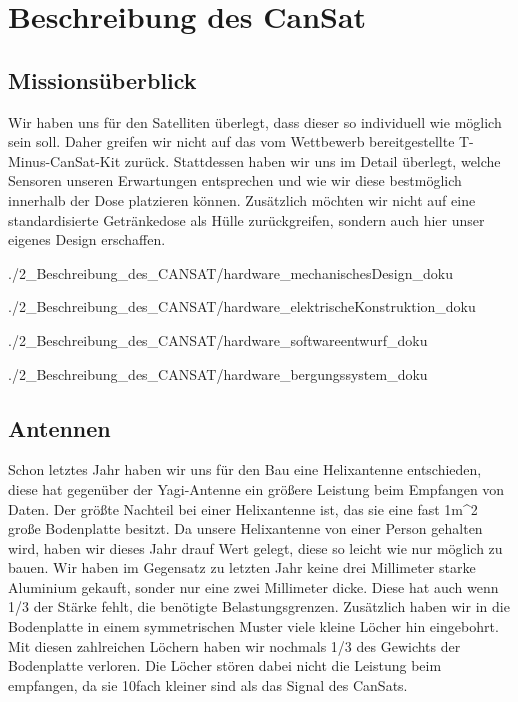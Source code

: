 \section{Beschreibung des CanSat}


\subsection{Missionsüberblick}
Wir haben uns für den Satelliten überlegt, dass dieser so individuell wie möglich sein soll. Daher greifen wir nicht auf das vom Wettbewerb bereitgestellte T-Minus-CanSat-Kit zurück. Stattdessen haben wir uns im Detail überlegt, welche Sensoren unseren Erwartungen entsprechen und wie wir diese bestmöglich innerhalb der Dose platzieren können. Zusätzlich möchten wir nicht auf eine standardisierte Getränkedose als Hülle zurückgreifen, sondern auch hier unser eigenes Design erschaffen.

 {./2_Beschreibung_des_CANSAT/hardware_mechanischesDesign_doku}

 {./2_Beschreibung_des_CANSAT/hardware_elektrischeKonstruktion_doku}

 {./2_Beschreibung_des_CANSAT/hardware_softwareentwurf_doku}

 {./2_Beschreibung_des_CANSAT/hardware_bergungssystem_doku}

\subsection{Antennen}
Schon letztes Jahr haben wir uns für den Bau eine Helixantenne entschieden, diese hat gegenüber der Yagi-Antenne ein größere Leistung beim Empfangen von Daten. Der größte Nachteil bei einer Helixantenne ist, das sie eine fast 1m^2 große Bodenplatte besitzt. Da unsere Helixantenne von einer Person gehalten wird, haben wir dieses Jahr drauf Wert gelegt, diese so leicht wie nur möglich zu bauen. Wir haben im Gegensatz zu letzten Jahr keine drei Millimeter starke Aluminium gekauft, sonder nur eine zwei Millimeter dicke. Diese hat auch wenn 1/3 der Stärke fehlt, die benötigte Belastungsgrenzen. Zusätzlich haben wir in die Bodenplatte in einem symmetrischen Muster viele kleine Löcher hin eingebohrt. Mit diesen zahlreichen Löchern haben wir nochmals 1/3 des Gewichts der Bodenplatte verloren. Die Löcher stören dabei nicht die Leistung beim empfangen, da sie 10fach kleiner sind als das Signal des CanSats.

